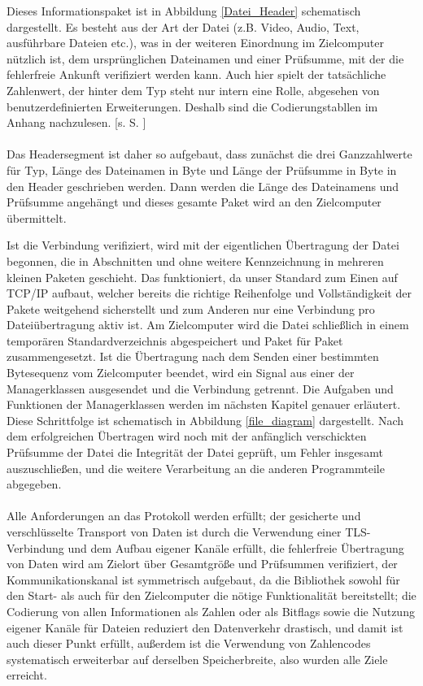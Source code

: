 Dieses Informationspaket ist in Abbildung \ref{Datei_Header} schematisch dargestellt.
Es besteht aus der Art der Datei (z.B. Video, Audio, Text, ausführbare Dateien etc.), was in der weiteren Einordnung im Zielcomputer nützlich ist, dem ursprünglichen Dateinamen und einer Prüfsumme, mit der die fehlerfreie Ankunft verifiziert werden kann. Auch hier spielt der tatsächliche Zahlenwert, der hinter dem Typ steht nur intern eine Rolle, abgesehen von benutzerdefinierten Erweiterungen. Deshalb sind die Codierungstabllen im Anhang nachzulesen. [s. S. \pageref{enums}]\\\\
Das Headersegment ist daher so aufgebaut, dass zunächst die drei Ganzzahlwerte für Typ, Länge des Dateinamen in Byte und Länge der Prüfsumme in Byte in den Header geschrieben werden. 
Dann werden die Länge des Dateinamens und Prüfsumme angehängt und dieses gesamte Paket wird an den Zielcomputer übermittelt.\par
Ist die Verbindung verifiziert, wird mit der eigentlichen Übertragung der Datei begonnen, die in Abschnitten und ohne weitere Kennzeichnung in mehreren kleinen Paketen geschieht.
Das funktioniert, da unser Standard zum Einen auf TCP/IP aufbaut, welcher bereits die richtige Reihenfolge und Vollständigkeit der Pakete weitgehend sicherstellt und zum Anderen nur eine Verbindung pro Dateiübertragung aktiv ist.
Am Zielcomputer wird die Datei schließlich in einem temporären Standardverzeichnis abgespeichert und Paket für Paket zusammengesetzt.
Ist die Übertragung nach dem Senden einer bestimmten Bytesequenz vom Zielcomputer beendet, wird ein Signal aus einer der Managerklassen ausgesendet und die Verbindung getrennt. Die Aufgaben und Funktionen der Managerklassen werden im nächsten Kapitel genauer erläutert.
Diese Schrittfolge ist schematisch in Abbildung \ref{file_diagram} dargestellt.
Nach dem erfolgreichen Übertragen wird noch mit der anfänglich verschickten Prüfsumme der Datei die Integrität der Datei geprüft, um Fehler insgesamt auszuschließen, und die weitere Verarbeitung an die anderen Programmteile abgegeben.\\\\
Alle Anforderungen an das Protokoll werden erfüllt; der gesicherte und verschlüsselte Transport von Daten ist durch die Verwendung einer TLS-Verbindung und dem Aufbau eigener Kanäle erfüllt, die fehlerfreie Übertragung von Daten wird am Zielort über Gesamtgröße und Prüfsummen verifiziert, der Kommunikationskanal ist symmetrisch aufgebaut, da die Bibliothek sowohl für den Start- als auch für den Zielcomputer die nötige Funktionalität bereitstellt; die Codierung von allen Informationen als Zahlen oder als Bitflags sowie die Nutzung eigener Kanäle für Dateien reduziert den Datenverkehr drastisch, und damit ist auch dieser Punkt erfüllt, außerdem ist die Verwendung von Zahlencodes systematisch erweiterbar auf derselben Speicherbreite, also wurden alle Ziele erreicht.

